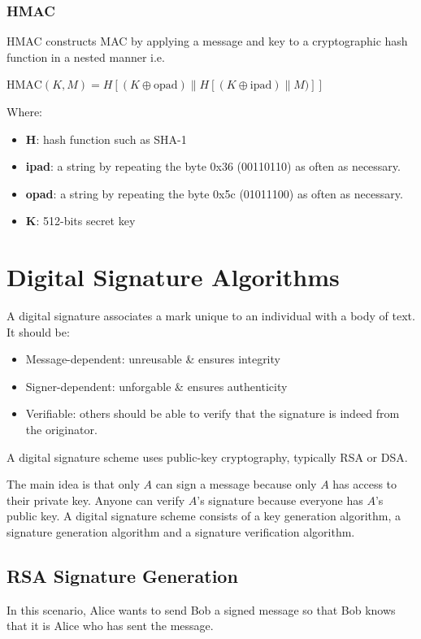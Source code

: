 \documentclass{article}
\begin{document}
\subsubsection{HMAC}
HMAC constructs MAC by applying a message and key to a cryptographic hash function in a nested manner i.e.
\begin{center}
  $\text{HMAC}(K, M) = H[(K \oplus \text{opad}) \| H[(K \oplus \text{ipad}) \| M)]]$
\end{center}
Where:
\begin{itemize}
  \item \textbf{H}: hash function such as SHA-1
  \item \textbf{ipad}: a string by repeating the byte 0x36 (00110110) as often as necessary.
  \item \textbf{opad}: a string by repeating the byte 0x5c (01011100) as often as necessary.
  \item \textbf{K}: 512-bits secret key
\end{itemize}

\section{Digital Signature Algorithms}
A digital signature associates a mark unique to an individual with a body of text. It should be:
\begin{itemize}
  \item Message-dependent: unreusable \& ensures integrity
  \item Signer-dependent: unforgable \& ensures authenticity
  \item Verifiable: others should be able to verify that the signature is indeed from the originator.
\end{itemize}
A digital signature scheme uses public-key cryptography, typically RSA or DSA.

The main idea is that only $A$ can sign a message because only $A$ has access to their private key. Anyone can verify $A$'s signature because everyone has $A$'s public key. A digital signature scheme consists of a key generation algorithm, a signature generation algorithm and a signature verification algorithm.

\subsection{RSA Signature Generation}
In this scenario, Alice wants to send Bob a signed message so that Bob knows that it is Alice who has sent the message.
\end{document}

